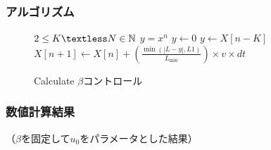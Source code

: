 \documentclass [dvipdfmx] {jsarticle}
\numberwithin{equation}{section}
\theoremstyle{definition} %
\theoremstyle{definition} %
\begin{document}
\subsubsection{アルゴリズム}
\begin{figure}[h]
    \begin{algorithm}[H]
        \caption{Calculate $\beta$コントロール}
        \label{alg1}
        \begin{algorithmic}[1]    
        \REQUIRE $2\le K \textless N\in\mathbb{N}$
        \ENSURE $y = x^n$
        \STATE $y \leftarrow 0$
        \ELSE
        \STATE $y \leftarrow X[n-K]$
        \ENDIF
        \STATE $X[n+1]\leftarrow X[n]+\left(\displaystyle\frac{\min(|L-y|,L1)}{L_{\min}}\right)\times v\times dt$
        \ENDFOR
        \end{algorithmic}
    \end{algorithm}
\end{figure}
\subsubsection{数値計算結果}
（$\beta$を固定して$u_0$をパラメータとした結果）
\end{document}
